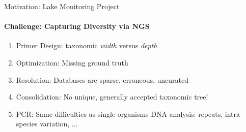 \documentclass[xcolor=dvipsnames,envcountsect]{beamer}
\begin{document}


\begin{frame}{Motivation: Lake Monitoring Project}
\framesubtitle{Challenge: Capturing Diversity via NGS}
\begin{enumerate}
     \item Primer Design: taxonomic {\it width} versus {\it depth} %
    \item Optimization: Missing ground truth %
    \item Resolution: Databases are sparse, erroneous, uncurated %
    \item Consolidation: No unique, generally accepted taxonomic tree!  %
    \item  PCR: Same difficulties as single organisms DNA analysis: repeats, intra-species variation, ...
\end{enumerate}
\end{frame}
\end{document}
